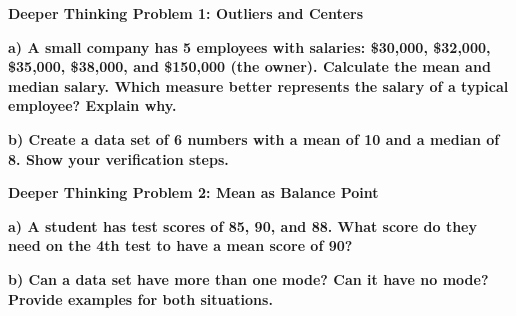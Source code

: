 \documentclass[12pt, letterpaper, fleqn]{article}
\begin{document}
\begin{tcolorbox}[colback=black!5, colframe=black!50, boxrule=1pt, arc=4mm, left=6mm, right=6mm, top=5mm, bottom=5mm]
\textbf{Deeper Thinking Problem 1: Outliers and Centers}

\medskip

\noindent
\textbf{a) A small company has 5 employees with salaries: \$30,000, \$32,000, \$35,000, \$38,000, and \$150,000 (the owner). Calculate the mean and median salary. Which measure better represents the salary of a typical employee? Explain why.}

\vspace{2.5cm}

\noindent
\textbf{b) Create a data set of 6 numbers with a mean of 10 and a median of 8. Show your verification steps.}

\vspace{2cm}
\end{tcolorbox}
\newpage

\begin{tcolorbox}[colback=black!5, colframe=black!50, boxrule=1pt, arc=4mm, left=6mm, right=6mm, top=5mm, bottom=5mm]
\textbf{Deeper Thinking Problem 2: Mean as Balance Point}

\medskip

\noindent
\textbf{a) A student has test scores of 85, 90, and 88. What score do they need on the 4th test to have a mean score of 90?}

\vspace{3cm}

\noindent
\textbf{b) Can a data set have more than one mode? Can it have no mode? Provide examples for both situations.}

\vspace{3cm}
\end{tcolorbox}
\newpage
\end{document}
